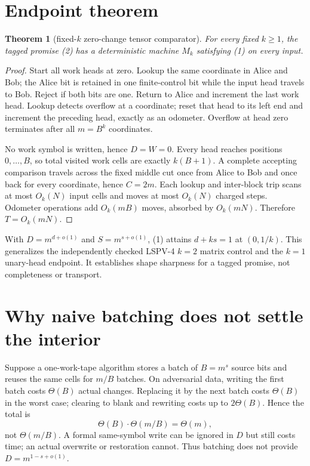 \documentclass[11pt]{article}
\newtheorem{theorem}{Theorem}
\begin{document}
\section{Endpoint theorem}
\begin{theorem}[fixed-$k$ zero-change tensor comparator]
For every fixed $k\geq1$, the tagged promise (2) has a deterministic machine
$M_k$ satisfying (1) on every input.
\end{theorem}
\begin{proof}
Start all work heads at zero.  Lookup the same coordinate in Alice and Bob;
the Alice bit is retained in one finite-control bit while the input head
travels to Bob.  Reject if both bits are one.  Return to Alice and increment
the last work head.  Lookup detects overflow at a coordinate; reset that head
to its left end and increment the preceding head, exactly as an odometer.
Overflow at head zero terminates after all $m=B^k$ coordinates.

No work symbol is written, hence $D=W=0$.  Every head reaches positions
$0,\ldots,B$, so total visited work cells are exactly $k(B+1)$.  A complete
accepting comparison travels across the fixed middle cut once from Alice to
Bob and once back for every coordinate, hence $C=2m$.  Each lookup and
inter-block trip scans at most $O_k(N)$ input cells and moves at most
$O_k(N)$ charged steps.  Odometer operations add $O_k(mB)$ moves, absorbed by
$O_k(mN)$.  Therefore $T=O_k(mN)$.
\end{proof}

With $D=m^{d+o(1)}$ and $S=m^{s+o(1)}$, (1) attains
$d+ks=1$ at $(0,1/k)$.  This generalizes the independently checked LSPV-4
$k=2$ matrix control and the $k=1$ unary-head endpoint.  It establishes
shape sharpness for a tagged promise, not completeness or transport.

\section{Why naive batching does not settle the interior}
Suppose a one-work-tape algorithm stores a batch of $B=m^s$ source bits and
reuses the same cells for $m/B$ batches.  On adversarial data, writing the
first batch costs $\Theta(B)$ actual changes.  Replacing it by the next batch
costs $\Theta(B)$ in the worst case; clearing to blank and rewriting costs up
to $2\Theta(B)$.  Hence the total is
\[
 \Theta(B)\cdot\Theta(m/B)=\Theta(m),                 \tag{4}
\]
not $\Theta(m/B)$.  A formal same-symbol write can be ignored in $D$ but still
costs time; an actual overwrite or restoration cannot.  Thus batching does
not provide $D=m^{1-s+o(1)}$.
\end{document}
